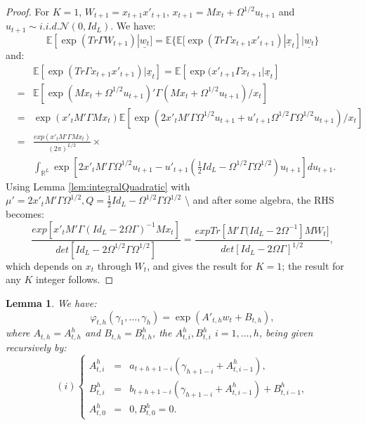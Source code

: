 \documentclass[
  12pt,
]{book}
\newtheorem{lemma}{Lemma}[chapter]
\theoremstyle{definition}
\theoremstyle{definition}
\theoremstyle{definition}
\theoremstyle{definition}
\theoremstyle{remark}
\begin{document}
\begin{proof}
For \(K=1\), \(W_{t+1}=x_{t+1} x'_{t+1}\), \(x_{t+1} = M x_t + \Omega^{1/2} u_{t+1}\) and \(u_{t+1} \sim i.i.d. \mathcal{N}(0,Id_L)\). We have:
\[
\mathbb{E}[\exp(Tr \Gamma W_{t+1})|\underline{w_t}] = \mathbb{E}\{\mathbb{E}[\exp(Tr \Gamma x_{t+1} x'_{t+1})|\underline{x}_t]|\underline{w_t}\}
\]
and:
\begin{eqnarray*}
&& \mathbb{E}[\exp(Tr \Gamma x_{t+1}x'_{t+1})|\underline{x}_t] = \mathbb{E}[\exp(x'_{t+1}\Gamma x_{t+1}|\underline{x}_t] \\
&=& \mathbb{E}[\exp(M x_t + \Omega^{1/2} u_{t+1})'\Gamma(M x_t + \Omega^{1/2} u_{t+1})/x_t] \\
&=& \exp(x'_tM'\Gamma M x_t)\mathbb{E}[\exp(2 x'_t M'\Gamma \Omega^{1/2}
u_{t+1}+u'_{t+1}\Omega^{1/2} \Gamma \Omega^{1/2} u_{t+1})/x_t] \\
&=&  \frac{exp(x'_tM'\Gamma M x_t)}{(2\pi)^{L/2}} \times \\
&& \int_{\mathbb{R}^L} \exp\left[2x'_tM'\Gamma
\Omega^{1/2}u_{t+1}-u'_{t+1}\left(
\frac{1}{2} Id_L-\Omega^{1/2} \Gamma \Omega^{1/2}\right)u_{t+1}\right]  du_{t+1}.
\end{eqnarray*}
Using Lemma \ref{lem:integralQuadratic} with \(\mu' = 2 x'_t M'\Gamma \Omega^{1/2}, Q = \frac{1}{2} Id_L-\Omega^{1/2}\Gamma\Omega^{1/2}\) \textbackslash{}
and after some algebra, the RHS becomes:
\[
\frac{exp[x'_tM'\Gamma(Id_L-2\Omega\Gamma)^{-1}M
x_t]}{det[Id_L-2\Omega^{1/2}\Gamma\Omega^{1/2}]} =  \frac{exp Tr[M'\Gamma(Id_L-2\Omega^{-1}]M
W_t]}{det[Id_L-2\Omega \Gamma]^{1/2}},
\]
which depends on \(x_t\) through \(W_t\), and gives the result for
\(K=1\); the result for any \(K\) integer follows.
\end{proof}

\begin{lemma}
\protect\hypertarget{lem:MHLT}{}\label{lem:MHLT}We have:
\[
\varphi_{t,h}(\gamma_1,\dots,\gamma_h) = \exp(A'_{t,h} w_t + B_{t,h}),
\]
where \(A_{t,h} = A^h_{t,h}\) and \(B_{t,h} = B^h_{t,h}\), the \(A^h_{t,i}, B^h_{t,i}\) \(i = 1,\dots,h\), being given recursively by:
\[
(i) \left\{
\begin{array}{ccl}
A^h_{t,i} &=& a_{t+h+1-i}(\gamma_{h+1-i} + A^h_{t,i-1}), \\
B^h_{t,i} &=& b_{t+h+1-i}(\gamma_{h+1-i} + A^h_{t,i-1}) + B^h_{t,i-1}, \\
A^h_{t,0} &=& 0, B^h_{t,0} = 0.
\end{array}
\right.
\]
\end{lemma}
\end{document}
